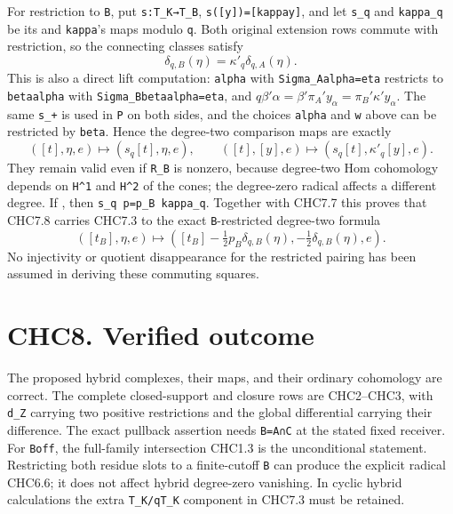 For restriction to \texttt{B}, put \texttt{s:T\_K→T\_B},
\texttt{s({[}y{]})={[}kappa\textquotesingle{}y{]}}, and let
\texttt{s\_q} and \texttt{kappa\textquotesingle{}\_q} be its and
\texttt{kappa\textquotesingle{}}'s maps modulo \texttt{q}. Both original
extension rows commute with restriction, so the connecting classes
satisfy \[
\delta_{q,B}(\eta)=\kappa'_q\delta_{q,A}(\eta).
\tag{CHC7.7}
\] This is also a direct lift computation: \texttt{alpha} with
\texttt{Sigma\_A\textquotesingle{}alpha=eta} restricts to
\texttt{beta\textquotesingle{}alpha} with
\texttt{Sigma\_B\textquotesingle{}beta\textquotesingle{}alpha=eta}, and
\(q\beta'\alpha=\beta'\pi_A'y_\alpha
=\pi_B'\kappa'y_\alpha\). The same \texttt{s\_+} is used in
\texttt{P\textquotesingle{}} on both sides, and the choices
\texttt{alpha} and \texttt{w} above can be restricted by
\texttt{beta\textquotesingle{}}. Hence the degree-two comparison maps
are exactly \[
([t],\eta,e)\longmapsto(s_q[t],\eta,e),
\qquad
([t],[y],e)\longmapsto(s_q[t],\kappa'_q[y],e).
\tag{CHC7.8}
\] They remain valid even if \texttt{R\_B} is nonzero, because
degree-two Hom cohomology depends on \texttt{H\^{}1} and \texttt{H\^{}2}
of the cones; the degree-zero radical affects a different degree. If
, then
\texttt{s\_q\ p=p\_B\ kappa\textquotesingle{}\_q}. Together with CHC7.7
this proves that CHC7.8 carries CHC7.3 to the exact
\texttt{B}-restricted degree-two formula \[
([t_B],\eta,e)\longmapsto
\left([t_B]-\tfrac12p_B\delta_{q,B}(\eta),
-\tfrac12\delta_{q,B}(\eta),e\right).
\tag{CHC7.9}
\] No injectivity or quotient disappearance for the restricted pairing
has been assumed in deriving these commuting squares.

\section{CHC8. Verified outcome}\label{chc8.-verified-outcome}

The proposed hybrid complexes, their maps, and their ordinary cohomology
are correct. The complete closed-support and closure rows are
CHC2--CHC3, with \texttt{d\_Z} carrying two positive restrictions and
the global differential carrying their difference. The exact pullback
assertion needs \texttt{B=A∩C} at the stated fixed receiver. For
\texttt{Boff}, the full-family intersection CHC1.3 is the unconditional
statement. Restricting both residue slots to a finite-cutoff \texttt{B}
can produce the explicit radical CHC6.6; it does not affect hybrid
degree-zero vanishing. In cyclic hybrid calculations the extra
\texttt{T\_K/qT\_K} component in CHC7.3 must be retained.

